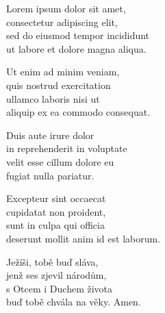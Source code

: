 \begin{translatioMulticol}{5}
Lorem ipsum dolor sit amet,\\
consectetur adipiscing elit,\\
sed do eiusmod tempor incididunt\\
ut labore et dolore magna aliqua.\columnbreak

Ut enim ad minim veniam,\\
quis nostrud exercitation\\
ullamco laboris nisi ut\\
aliquip ex ea commodo consequat.\columnbreak

Duis aute irure dolor\\
in reprehenderit in voluptate\\
velit esse cillum dolore eu\\
fugiat nulla pariatur.\columnbreak

Excepteur sint occaecat\\
cupidatat non proident,\\
sunt in culpa qui officia\\
deserunt mollit anim id est laborum.\columnbreak

Ježíši, tobě buď sláva,\\
jenž ses zjevil národům,\\
s Otcem i Duchem života\\
buď tobě chvála na věky.
Amen.
\end{translatioMulticol}
